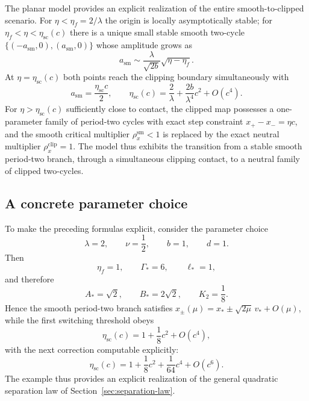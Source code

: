 The planar model provides an explicit realization of the entire
smooth-to-clipped scenario.  For $\eta<\eta_f=2/\lambda$ the origin
is locally asymptotically stable; for
$\eta_f<\eta<\eta_{\mathrm{sc}}(c)$ there is a unique small stable
smooth two-cycle
$\{(-a_{\mathrm{sm}},0),(a_{\mathrm{sm}},0)\}$ whose amplitude
grows as
\[
a_{\mathrm{sm}}
\sim
\frac{\lambda}{\sqrt{2b}}
\sqrt{\eta-\eta_f}.
\]
At $\eta=\eta_{\mathrm{sc}}(c)$ both points reach the clipping
boundary simultaneously with
\[
a_{\mathrm{sm}}
=
\frac{\eta_{\mathrm{sc}}c}{2},
\qquad
\eta_{\mathrm{sc}}(c)
=
\frac{2}{\lambda}
+
\frac{2b}{\lambda^4}c^2
+
O(c^4).
\label{eq:planar-summary-separation}
\]
For $\eta>\eta_{\mathrm{sc}}(c)$ sufficiently close to contact, the
clipped map possesses a one-parameter family of period-two cycles
with exact step constraint $x_+-x_-=\eta c$, and the smooth critical
multiplier $\rho_x^{\mathrm{sm}}<1$ is replaced by the exact neutral
multiplier $\rho_x^{\mathrm{clip}}=1$.  The model thus exhibits the
transition from a stable smooth period-two branch, through a
simultaneous clipping contact, to a neutral family of clipped
two-cycles.

\subsection{A concrete parameter choice}

To make the preceding formulas explicit, consider the parameter
choice
\[
\lambda=2,\qquad
\nu=\frac12,\qquad
b=1,\qquad
d=1.
\]
Then
\[
\eta_f=1,
\qquad
\Gamma_*=6,
\qquad
\ell_*=1,
\]
and therefore
\[
A_*=\sqrt{2},
\qquad
B_*=2\sqrt{2},
\qquad
K_2=\frac18.
\]
Hence the smooth period-two branch satisfies
$x_\pm(\mu)=x_*\pm\sqrt{2\mu}\,v_*+O(\mu)$, while the first
switching threshold obeys
\[
\eta_{\mathrm{sc}}(c)
=
1+\frac18c^2+O(c^4),
\]
with the next correction computable explicitly:
\[
\eta_{\mathrm{sc}}(c)
=
1+\frac18c^2+\frac1{64}c^4+O(c^6).
\]
The example thus provides an explicit realization of the general
quadratic separation law of Section~\ref{sec:separation-law}.